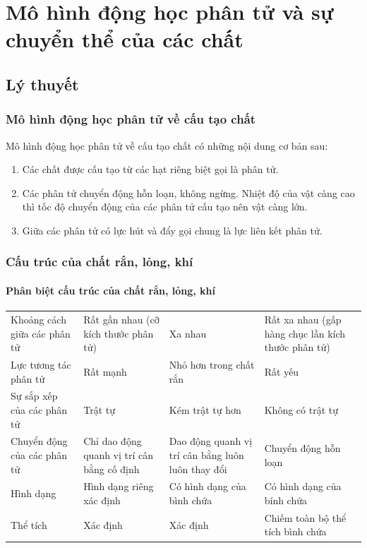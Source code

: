 \let\lesson\undefined
\newcommand{\lesson}{\phantomlesson{Bài 1: Sự chuyển thể}}
\chapter[Mô hình động học phân tử và sự chuyển thể của các chất]{Mô hình động học phân tử và sự chuyển thể của các chất}
\section{Lý thuyết}
\subsection{Mô hình động học phân tử về cấu tạo chất}
Mô hình động học phân tử về cấu tạo chất có những nội dung cơ bản sau:
\begin{enumerate}[label=\arabic*.]
	\item Các chất được cấu tạo từ các hạt riêng biệt gọi là phân tử.
	\item Các phân tử chuyển động hỗn loạn, không ngừng. Nhiệt độ của vật càng cao thì tốc độ chuyển động của các phân tử cấu tạo nên vật càng lớn.
	\item Giữa các phân tử có lực hút và đẩy gọi chung là lực liên kết phân tử.
\end{enumerate}
\subsection{Cấu trúc của chất rắn, lỏng, khí}
\subsubsection{Phân biệt cấu trúc của chất rắn, lỏng, khí}
\begin{center}
	\begin{tabular}{|p{3cm}|p{3cm}|p{3cm}|p{3cm}|}
		\hline
		\rowcolor{red!25!white}
		\thead{Đặc điểm}&\thead{Thể rắn} &\thead{Thể lỏng}&\thead{Thể khí}\\
		\hline
		Khoảng cách giữa các phân tử & Rất gần nhau (cỡ kích thước phân tử) & Xa nhau & Rất xa nhau (gấp hàng chục lần kích thước phân tử)\\
		\hline
		Lực tương tác phân tử & Rất mạnh & Nhỏ hơn trong chất rắn & Rất yếu\\
		\hline
		Sự sắp xếp của các phân tử & Trật tự & Kém trật tự hơn & Không có trật tự\\
		\hline
		Chuyển động của các phân tử & Chỉ dao động quanh vị trí cân bằng cố định & Dao động quanh vị trí cân bằng luôn luôn thay đổi & Chuyển động hỗn loạn \\
		\hline
		Hình dạng & Hình dạng riêng xác định & Có hình dạng của bình chứa & Có hình dạng của bính chứa\\
		\hline
		Thể tích & Xác định & Xác định & Chiếm toàn bộ thể tích bình chứa\\
		\hline
	\end{tabular}
\end{center}
